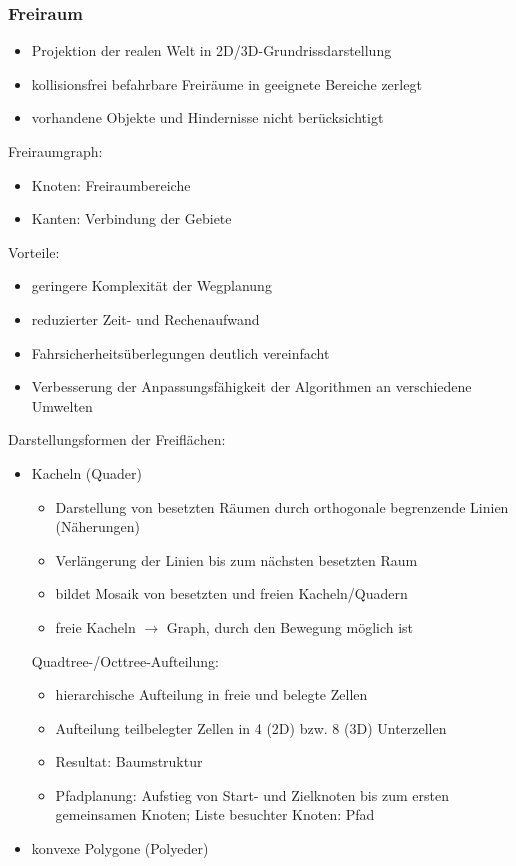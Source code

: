 \subsubsection*{Freiraum}

\begin{itemize}
\item Projektion der realen Welt in 2D/3D-Grundrissdarstellung
\item kollisionsfrei befahrbare Freiräume in geeignete Bereiche zerlegt
\item vorhandene Objekte und Hindernisse nicht berücksichtigt
\end{itemize}
Freiraumgraph:
\begin{itemize}
\item Knoten: Freiraumbereiche
\item Kanten: Verbindung der Gebiete
\end{itemize}
Vorteile:
\begin{itemize}
\item geringere Komplexität der Wegplanung
\item reduzierter Zeit- und Rechenaufwand
\item Fahrsicherheitsüberlegungen deutlich vereinfacht
\item Verbesserung der Anpassungsfähigkeit der Algorithmen an verschiedene Umwelten
\end{itemize}
Darstellungsformen der Freiflächen:
\begin{itemize}
\item Kacheln (Quader)
\begin{itemize}
\item Darstellung von besetzten Räumen durch orthogonale begrenzende Linien (Näherungen)
\item Verlängerung der Linien bis zum nächsten besetzten Raum
\item bildet Mosaik von besetzten und freien Kacheln/Quadern
\item freie Kacheln $\to$ Graph, durch den Bewegung möglich ist
\end{itemize}
Quadtree-/Octtree-Aufteilung:
\begin{itemize}
\item hierarchische Aufteilung in freie und belegte Zellen
\item Aufteilung teilbelegter Zellen in 4 (2D) bzw. 8 (3D) Unterzellen
\item Resultat: Baumstruktur
\item Pfadplanung: Aufstieg von Start- und Zielknoten bis zum ersten gemeinsamen Knoten; Liste besuchter Knoten: Pfad
\end{itemize}
\item konvexe Polygone (Polyeder)
\end{itemize}



